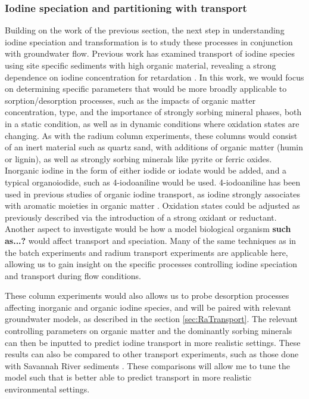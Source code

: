 \documentclass[twoside,12pt,titlepage]{article}
\begin{document}
\subsubsection{Iodine speciation and partitioning with transport}
Building on the work of the previous section, the next step in understanding iodine speciation and transformation is to study these processes in conjunction with groundwater flow. Previous work has examined transport of iodine species using site specific sediments with high organic material, revealing a strong dependence on iodine concentration for retardation \cite{Zhang2011}. In this work, we would focus on determining specific parameters that would be more broadly applicable to sorption/desorption processes, such as the impacts of organic matter concentration, type, and the importance of strongly sorbing mineral phases, both in a static condition, as well as in dynamic conditions where oxidation states are changing. As with the radium column experiments, these columns would consist of an inert material such as quartz sand, with additions of organic matter (humin or lignin), as well as strongly sorbing minerals like pyrite or ferric oxides. Inorganic iodine in the form of either iodide or iodate would be added, and a typical organoiodide, such as 4-iodoaniline would be used. 4-iodoaniline has been used in previous studies of organic iodine transport, as iodine strongly associates with aromatic moieties in organic matter \cite{Kaplan2014}. Oxidation states could be adjusted as previously described via the introduction of a strong oxidant or reductant. Another aspect to investigate would be how a model biological organism \textbf{such as...?} would affect transport and speciation. Many of the same techniques as in the batch experiments and radium transport experiments are applicable here, allowing us to gain insight on the specific processes controlling iodine speciation and transport during flow conditions.
\par These column experiments would also allows us to probe desorption processes affecting inorganic and organic iodine species, and will be paired with relevant groundwater models, as described in the section \ref{sec:RaTransport}. The relevant controlling parameters on organic matter and the dominantly sorbing minerals can then be inputted to predict iodine transport in more realistic settings. These results can also be compared to other transport experiments, such as those done with Savannah River sediments \cite{Zhang2011}. These comparisons will allow me to tune the model such that is better able to predict transport in more realistic environmental settings.
\end{document}
